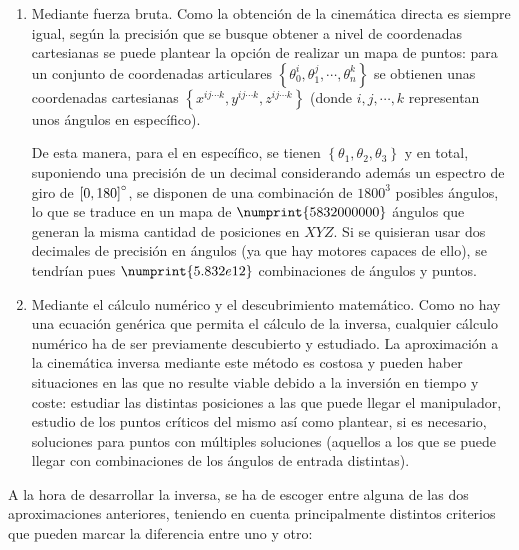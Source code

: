 \begin{enumerate}
    \item Mediante fuerza bruta. Como la obtención de la cinemática directa es siempre
          igual, según la precisión que se busque obtener a nivel de coordenadas cartesianas
          se puede plantear la opción de realizar un mapa de puntos: para un conjunto de
          coordenadas articulares $\left\{\theta_0^i,\theta_1^j,\cdots,\theta_n^k\right\}$ se
          obtienen unas coordenadas cartesianas
          $\left\{x^{ij\cdots k}, y^{ij\cdots k}, z^{ij\cdots k}\right\}$
          (donde $i,j,\cdots,k$ representan unos ángulos en específico).

          De esta manera, para el \pArm{} en específico, se tienen
          $\left\{\theta_1, \theta_2, \theta_3\right\}$ y en total, suponiendo una precisión
          de un decimal considerando además un espectro de giro de $\left[0,180\right]\degree$,
          se disponen de una combinación de $1800^3$ posibles ángulos, lo que se traduce
          en un mapa de $\numprint{5832000000}$ ángulos que generan la misma cantidad de posiciones
          en $XYZ$. Si se quisieran usar dos decimales de precisión en ángulos (ya que hay motores capaces
          de ello), se tendrían pues $\numprint{5.832e12}$ combinaciones de ángulos y puntos.

    \item Mediante el cálculo numérico y el descubrimiento matemático. Como no hay una
          ecuación genérica que permita el cálculo de la inversa, cualquier cálculo numérico ha
          de ser previamente descubierto y estudiado. La aproximación a la cinemática inversa
          mediante este método es costosa y pueden haber situaciones en las que no resulte
          viable debido a la inversión en tiempo y coste: estudiar las distintas posiciones
          a las que puede llegar el manipulador, estudio de los puntos críticos del mismo
          así como plantear, si es necesario, soluciones para puntos con múltiples soluciones
          (aquellos a los que se puede llegar con combinaciones de los ángulos de entrada
          distintas).
\end{enumerate}

A la hora de desarrollar la inversa, se ha de escoger entre alguna de las dos aproximaciones
anteriores, teniendo en cuenta principalmente distintos criterios que pueden marcar la
diferencia entre uno y otro:

